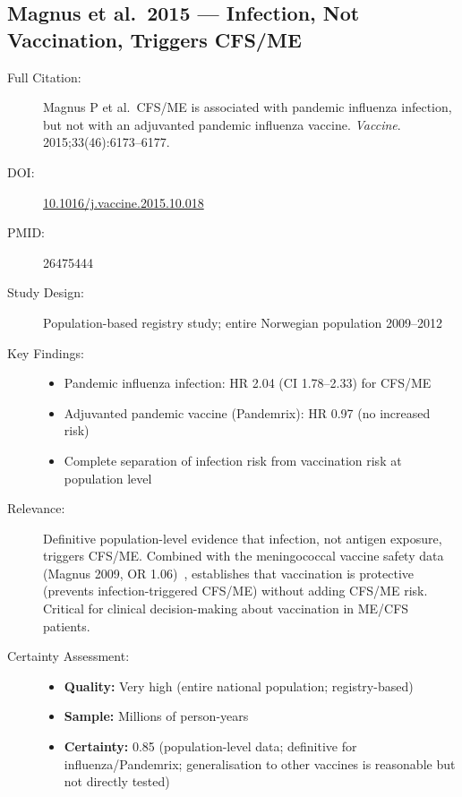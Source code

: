 \subsection{Magnus et al.\ 2015 --- Infection, Not Vaccination, Triggers CFS/ME}

\begin{description}
    \item[Full Citation:] Magnus P et al.\ CFS/ME is associated with pandemic influenza infection, but not with an adjuvanted pandemic influenza vaccine. \textit{Vaccine}. 2015;33(46):6173--6177.
    \item[DOI:] \href{https://doi.org/10.1016/j.vaccine.2015.10.018}{10.1016/j.vaccine.2015.10.018}
    \item[PMID:] 26475444
    \item[Study Design:] Population-based registry study; entire Norwegian population 2009--2012
    \item[Key Findings:]
    \begin{itemize}
        \item Pandemic influenza infection: HR 2.04 (CI 1.78--2.33) for CFS/ME
        \item Adjuvanted pandemic vaccine (Pandemrix): HR 0.97 (no increased risk)
        \item Complete separation of infection risk from vaccination risk at population level
    \end{itemize}
    \item[Relevance:] Definitive population-level evidence that infection, not antigen exposure, triggers CFS/ME. Combined with the meningococcal vaccine safety data (Magnus 2009, OR 1.06)~\cite{Magnus2009meningococcal}, establishes that vaccination is protective (prevents infection-triggered CFS/ME) without adding CFS/ME risk. Critical for clinical decision-making about vaccination in ME/CFS patients.
    \item[Certainty Assessment:]
    \begin{itemize}
        \item \textbf{Quality:} Very high (entire national population; registry-based)
        \item \textbf{Sample:} Millions of person-years
        \item \textbf{Certainty:} 0.85 (population-level data; definitive for influenza/Pandemrix; generalisation to other vaccines is reasonable but not directly tested)
    \end{itemize}
\end{description}

